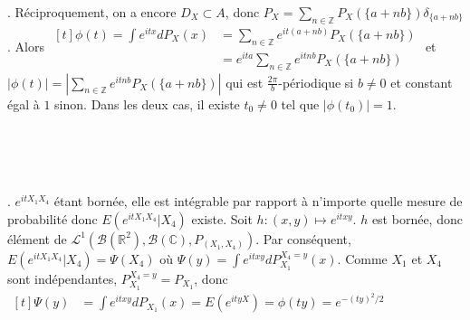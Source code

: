 \documentclass{report}
\begin{document}
. Réciproquement, on a encore $D_X\subset A$, donc  $P_X=\sum_{n\in \mathbb Z} P_X(\{a+nb\}) \delta_{\{a+nb\}}$.\newline
Alors $\begin{aligned}[t]\phi(t)=\int e^{itx} dP_X(x)&=\sum_{n\in \mathbb Z} e^{it(a+nb)}P_X(\{a+nb\})\\ &=e^{ita}\sum_{n\in \mathbb Z} e^{itnb}P_X(\{a+nb\})
\end{aligned}$\newline
et $|\phi(t)|=\left| \sum_{n\in \mathbb Z} e^{itnb}P_X(\{a+nb\})\right|$ qui est $\frac{2\pi}b$-périodique si $b\neq 0$ et constant égal à $1$ sinon.
Dans les deux cas, il existe $t_0\neq 0$ tel que $|\phi(t_0)|=1$.


\subsection{} \noindent{}\\ 
\\ 
\\
. $e^{itX_1X_4}$ étant bornée, elle est intégrable par rapport à n'importe quelle mesure de probabilité donc $E(e^{itX_1X_4}|X_4)$ existe. Soit $h:(x,y)\mapsto e^{itxy}$. $h$ est bornée, donc élément de $\mathscr L^1(\mathcal B(\mathbb R^2), \mathcal B(\mathbb C), P_{(X_1,X_4)})$. Par conséquent, $E(e^{itX_1X_4}|X_4)=\Psi(X_4)$ où $\Psi(y)=\int e^{itxy}dP^{X_4=y}_{X_1}(x)$. Comme $X_1$ et $X_4$ sont indépendantes, $P^{X_4=y}_{X_1} = P_{X_1}$, donc $\begin{aligned}[t]
\Psi(y)&=\int e^{itxy}dP_{X_1}(x) = E(e^{ityX})=\phi(ty)=e^{-(ty)^2/2}
\end{aligned}$\newline
\end{document}
